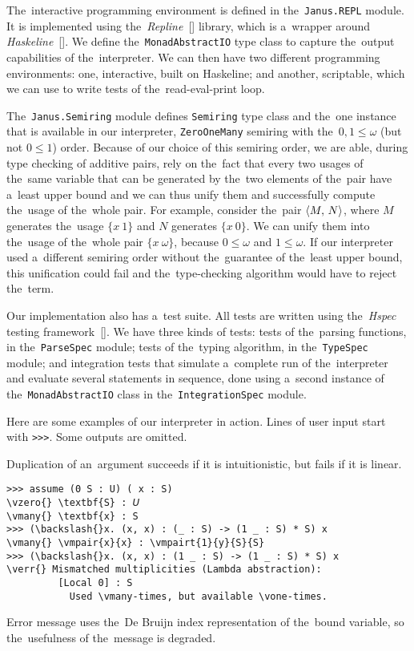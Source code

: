 The~interactive programming environment is defined in the~\texttt{Janus.REPL}
module. It is implemented using
the~\emph{Repline}~[\citeauthor{repline}] library, which is a~wrapper around
\emph{Haskeline}~[\citeauthor{haskeline}]. We define
the~\texttt{MonadAbstractIO} type class to capture the~output capabilities of
the~interpreter. We can then have two different programming environments: one,
interactive, built on Haskeline; and another, scriptable, which we can use to
write tests of the~read-eval-print loop.

The~\texttt{Janus.Semiring} module defines \texttt{Semiring} type class and
the~one instance that is available in our interpreter, \texttt{ZeroOneMany}
semiring with the~$0, 1 \leq \omega$ (but not $0 \leq 1$) order. Because of our
choice of this semiring order, we are able, during type checking of additive
pairs, rely on the~fact that every two usages of the~same variable that can be
generated by the~two elements of the~pair have a~least upper bound and we can
thus unify them and successfully compute the~usage of the~whole pair. For
example, consider the~pair $\langle M, \, N\rangle$, where $M$ generates the~usage
$\{x \: 1\}$ and $N$ generates $\{x \: 0\}$. We can unify them into the~usage of
the~whole pair $\{x \: \omega\}$, because $0 \leq \omega$ and $1 \leq \omega$.
If our interpreter used a~different semiring order without the~guarantee of
the~least upper bound, this unification could fail and the~type-checking
algorithm would have to reject the~term.

Our implementation also has a~test suite. All tests are written using
the~\emph{Hspec} testing framework~[\citeauthor{hspec}]. We have three kinds of
tests: tests of the~parsing functions, in the~\texttt{ParseSpec} module; tests
of the~typing algorithm, in the~\texttt{TypeSpec} module; and integration tests
that simulate a~complete run of the~interpreter and evaluate several statements
in sequence, done using a~second instance of the~\texttt{MonadAbstractIO} class
in the~\texttt{IntegrationSpec} module.


Here are some examples of our interpreter in action. Lines of user input start
with \texttt{>>>}. Some outputs are omitted.

Duplication of an~argument succeeds if it is intuitionistic, but fails if it is
linear.
\begin{Verbatim}
>>> assume (0 S : U) ( x : S)
\vzero{} \textbf{S} : 𝘜
\vmany{} \textbf{x} : S
>>> (\backslash{}x. (x, x) : (_ : S) -> (1 _ : S) * S) x
\vmany{} \vmpair{x}{x} : \vmpairt{1}{y}{S}{S}
>>> (\backslash{}x. (x, x) : (1 _ : S) -> (1 _ : S) * S) x
\verr{} Mismatched multiplicities (Lambda abstraction):
         [Local 0] : S
           Used \vmany-times, but available \vone-times.
\end{Verbatim}
Error message uses the~De Bruijn index representation of the~bound variable, so
the~usefulness of the~message is degraded.

